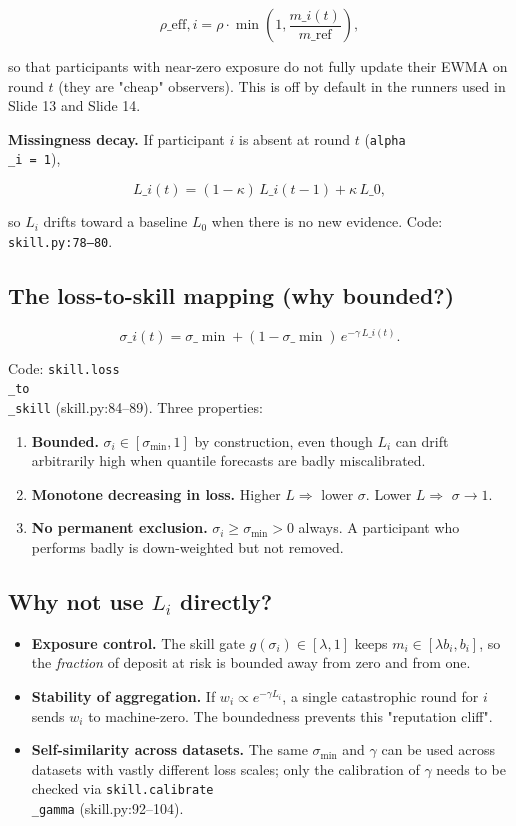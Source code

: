 \documentclass[11pt]{article}
\begin{document}
$$
\rho\_{\text{eff},i} = \rho \cdot \min\!\left(1, \frac{m\_i(t)}{m\_{\text{ref}}}\right),
$$

so that participants with near-zero exposure do not fully update their EWMA on round $t$ (they are "cheap" observers). This is off by default in the runners used in Slide 13 and Slide 14.

\textbf{Missingness decay.} If participant $i$ is absent at round $t$ (\texttt{alpha\\_i = 1}),

$$
L\_i(t) = (1 - \kappa)\,L\_i(t-1) + \kappa\,L\_0,
$$

so $L_i$ drifts toward a baseline $L_0$ when there is no new evidence. Code: \texttt{skill.py:78--80}.

\subsection{The loss-to-skill mapping (why bounded?)}


$$
\sigma\_i(t) = \sigma\_{\min} + (1 - \sigma\_{\min})\,e^{-\gamma\, L\_i(t)}.
$$

Code: \texttt{skill.loss\\_to\\_skill} (skill.py:84--89). Three properties:

\begin{enumerate}
\item \textbf{Bounded.} $\sigma_i \in [\sigma_{\min}, 1]$ by construction, even though $L_i$ can drift arbitrarily high when quantile forecasts are badly miscalibrated.
\item \textbf{Monotone decreasing in loss.} Higher $L \Rightarrow$ lower $\sigma$. Lower $L \Rightarrow$ $\sigma \to 1$.
\item \textbf{No permanent exclusion.} $\sigma_i \ge \sigma_{\min} > 0$ always. A participant who performs badly is down-weighted but not removed.
\end{enumerate}

\subsection{Why not use $L_i$ directly?}


\begin{itemize}
\item \textbf{Exposure control.} The skill gate $g(\sigma_i) \in [\lambda, 1]$ keeps $m_i \in [\lambda b_i, b_i]$, so the \emph{fraction} of deposit at risk is bounded away from zero and from one.
\item \textbf{Stability of aggregation.} If $w_i \propto e^{-\gamma L_i}$, a single catastrophic round for $i$ sends $w_i$ to machine-zero. The boundedness prevents this "reputation cliff".
\item \textbf{Self-similarity across datasets.} The same $\sigma_{\min}$ and $\gamma$ can be used across datasets with vastly different loss scales; only the calibration of $\gamma$ needs to be checked via \texttt{skill.calibrate\\_gamma} (skill.py:92--104).
\end{itemize}
\end{document}
